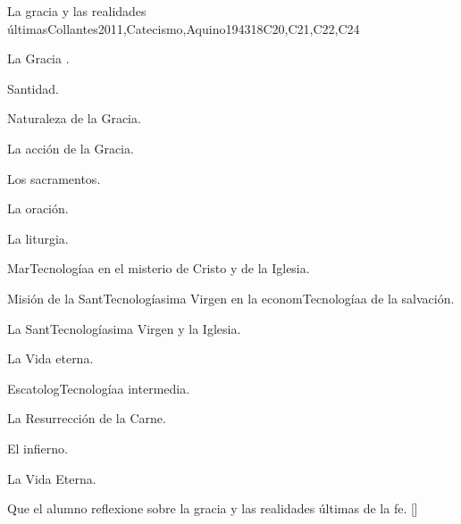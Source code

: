 \begin{syllabus}
\begin{unit}{}{La gracia y las realidades últimas}{Collantes2011,Catecismo,Aquino1943}{18}{C20,C21,C22,C24}
\begin{topics}
	\item La Gracia .
	      \begin{subtopics}
		\item Santidad.
		\item Naturaleza de la Gracia.
		\item La acción de la Gracia.
		\item Los sacramentos.
		\item La oración.
		\item La liturgia.
	      \end{subtopics}
	\item MarTecnologíaa en el misterio de Cristo y de la Iglesia.
	      \begin{subtopics}
		\item Misión de la SantTecnologíasima Virgen en la economTecnologíaa de la salvación.
		\item La SantTecnologíasima Virgen y la Iglesia.
	      \end{subtopics}
	\item La Vida eterna.
	      \begin{subtopics}
		\item EscatologTecnologíaa intermedia.
		\item La Resurrección de la Carne.
		\item El infierno.
		\item La Vida Eterna.
	      \end{subtopics}
\end{topics}
\begin{learningoutcomes}
	\item Que el alumno reflexione sobre la gracia y las realidades últimas de la fe. [\Usage]
\end{learningoutcomes}
\end{unit}



\begin{coursebibliography}
\end{coursebibliography}
\end{syllabus}
